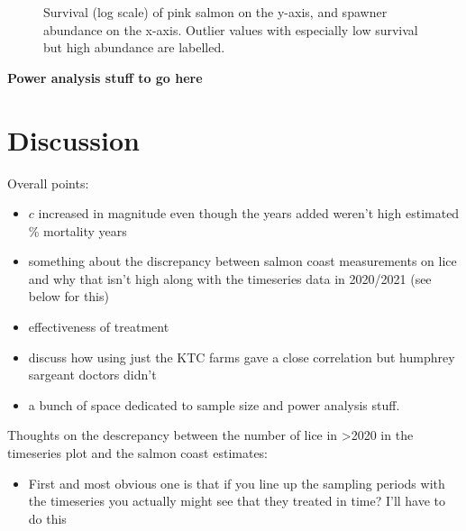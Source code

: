\documentclass{article}
\begin{document}
\begin{figure}[h]
    \centering
    \caption{Survival (log scale) of pink salmon on the y-axis, and spawner abundance on the x-axis. Outlier values with especially low survival but high abundance are labelled.}
    \label{fig:surv}
\end{figure} 

\textbf{Power analysis stuff to go here}

\section{Discussion}

Overall points:
\begin{itemize}
    \item $c$ increased in magnitude even though the years added weren't high estimated \% mortality years 
    \item something about the discrepancy between salmon coast measurements on lice and why that isn't high along with the timeseries data in 2020/2021 (see below for this)
    \item effectiveness of treatment
    \item discuss how using just the KTC farms gave a close correlation but humphrey sargeant doctors didn't
    \item a bunch of space dedicated to sample size and power analysis stuff. 
\end{itemize}

Thoughts on the descrepancy between the number of lice in >2020 in the timeseries plot and the salmon coast estimates:
\begin{itemize}
    \item First and most obvious one is that if you line up the sampling periods with the timeseries you actually might see that they treated in time? I'll have to do this
\end{itemize}

\printbibliography
\end{document}
